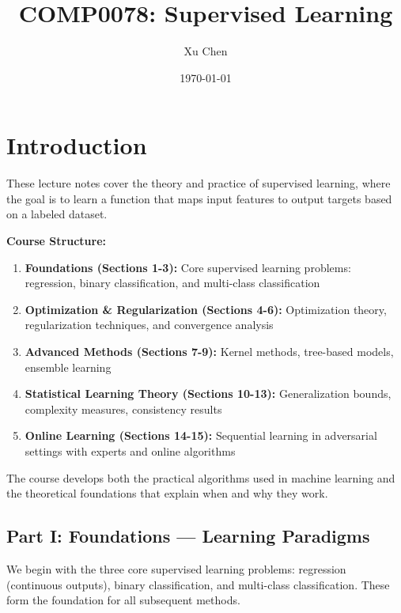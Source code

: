 \documentclass[12pt,a4paper]{article}
\title{COMP0078: Supervised Learning}
\author{Xu Chen}
\date{\today}
\theoremstyle{definition}
\begin{document}
\maketitle
\tableofcontents
\newpage

\section*{Introduction}

These lecture notes cover the theory and practice of supervised learning, where the goal is to learn a function that maps input features to output targets based on a labeled dataset.

\vspace{0.5cm}
\noindent\textbf{Course Structure:}
\begin{enumerate}
    \item \textbf{Foundations (Sections 1-3):} Core supervised learning problems: regression, binary classification, and multi-class classification
    \item \textbf{Optimization \& Regularization (Sections 4-6):} Optimization theory, regularization techniques, and convergence analysis
    \item \textbf{Advanced Methods (Sections 7-9):} Kernel methods, tree-based models, ensemble learning
    \item \textbf{Statistical Learning Theory (Sections 10-13):} Generalization bounds, complexity measures, consistency results
    \item \textbf{Online Learning (Sections 14-15):} Sequential learning in adversarial settings with experts and online algorithms
\end{enumerate}

The course develops both the practical algorithms used in machine learning and the theoretical foundations that explain when and why they work.

\newpage
\newpage
\vspace*{2cm}
\begin{center}
    \section*{\Large Part I: Foundations --- Learning Paradigms}
\end{center}
\vspace*{1cm}
\nobreak

We begin with the three core supervised learning problems: regression (continuous outputs), binary classification, and multi-class classification. These form the foundation for all subsequent methods.
\end{document}
